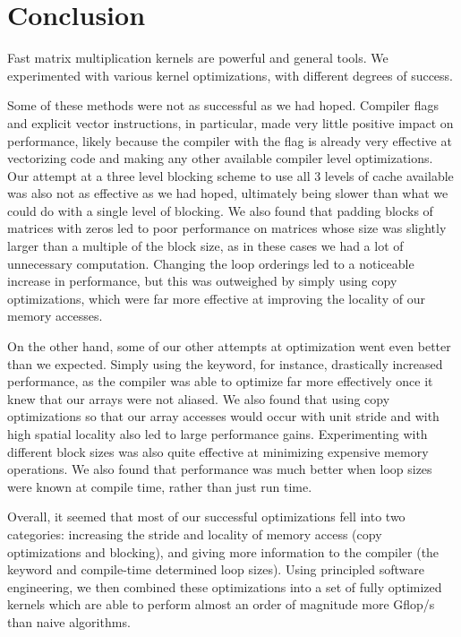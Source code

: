 \section{Conclusion}\label{sec:conc}
Fast matrix multiplication kernels are powerful and general tools. We
experimented with various kernel optimizations, with different degrees of
success.

Some of these methods were not as successful as we had hoped.  Compiler flags
and explicit vector instructions, in particular, made very little positive
impact on performance, likely because the  compiler with the 
flag is already very effective at vectorizing code and making any other
available compiler level optimizations.  Our attempt at a three level blocking
scheme to use all 3 levels of cache available was also not as effective as we
had hoped, ultimately being slower than what we could do with a single level of
blocking.  We also found that padding blocks of matrices with zeros led to poor
performance on matrices whose size was slightly larger than a multiple of the
block size, as in these cases we had a lot of unnecessary computation.
Changing the loop orderings led to a noticeable increase in performance, but
this was outweighed by simply using copy optimizations, which were far more
effective at improving the locality of our memory accesses.

On the other hand, some of our other attempts at optimization went even better
than we expected.  Simply using the  keyword, for instance,
drastically increased performance, as the compiler was able to optimize far
more effectively once it knew that our arrays were not aliased.  We also found
that using copy optimizations so that our array accesses would occur with unit
stride and with high spatial locality also led to large performance gains.
Experimenting with different block sizes was also quite effective at minimizing
expensive memory operations.  We also found that performance was much better
when loop sizes were known at compile time, rather than just run time.

Overall, it seemed that most of our successful optimizations fell into two
categories: increasing the stride and locality of memory access (copy
optimizations and blocking), and giving more information to the compiler (the
 keyword and compile-time determined loop sizes). Using
principled software engineering, we then combined these optimizations into a
set of fully optimized kernels which are able to perform almost an order of
magnitude more Gflop/s than naive algorithms.

